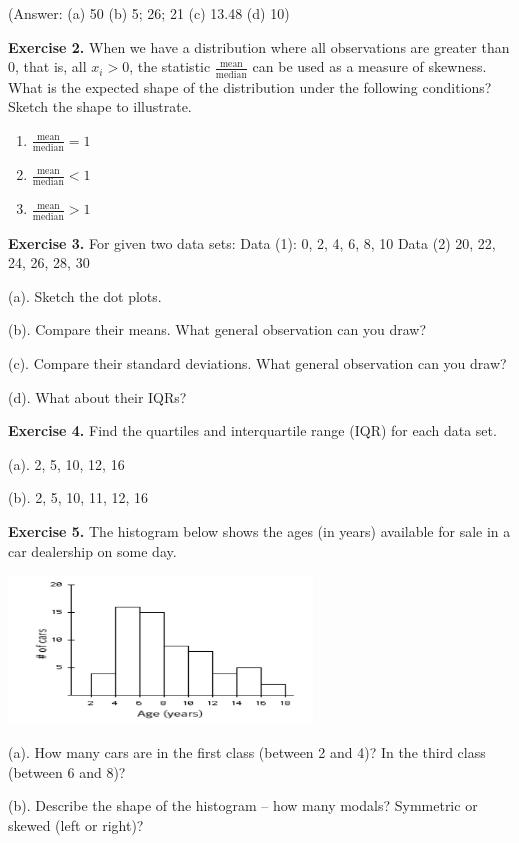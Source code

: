 \documentclass[
]{book}
\begin{document}
(Answer: (a) 50 (b) 5; 26; 21 (c) 13.48 (d) 10)

\textbf{Exercise 2.} When we have a distribution where all observations are greater than 0, that is, all \(x_i > 0\), the statistic \(\frac{\text{mean}}{\text{median}}\) can be used as a measure of skewness. What is the expected shape of the distribution under the following conditions? Sketch the shape to illustrate.

\begin{enumerate}
\def\labelenumi{(\alph{enumi})}
\item
  \(\frac{\text{mean}}{\text{median}} = 1\)
\item
  \(\frac{\text{mean}}{\text{median}} < 1\)
\item
  \(\frac{\text{mean}}{\text{median}} > 1\)
\end{enumerate}

\textbf{Exercise 3.} For given two data sets: Data (1): 0, 2, 4, 6, 8, 10 Data (2) 20, 22, 24, 26, 28, 30

(a). Sketch the dot plots.

(b). Compare their means. What general observation can you draw?

(c). Compare their standard deviations. What general observation can you draw?

(d). What about their IQRs?

\textbf{Exercise 4.} Find the quartiles and interquartile range (IQR) for each data set.

(a). 2, 5, 10, 12, 16

(b). 2, 5, 10, 11, 12, 16

\textbf{Exercise 5.} The histogram below shows the ages (in years) available for sale in a car dealership on some day.

\includegraphics[width=3.17708in,height=\textheight]{images/img24.png}

(a). How many cars are in the first class (between 2 and 4)? In the third class (between 6 and 8)?

(b). Describe the shape of the histogram -- how many modals? Symmetric or skewed (left or right)?
\end{document}
